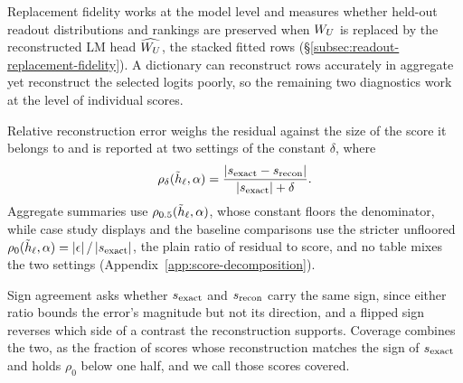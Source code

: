 Replacement fidelity works at the model level and measures whether
held-out readout distributions and rankings are preserved when
\(W_U\) is replaced by the reconstructed LM head \(\widehat{W_U}\),
the stacked fitted rows (\S\ref{subsec:readout-replacement-fidelity}). A dictionary
can reconstruct rows accurately in aggregate yet reconstruct the
selected logits poorly, so the remaining two diagnostics work at the
level of individual scores.

Relative reconstruction error weighs the
residual against the size of the score it belongs to and is reported
at two settings of the constant \(\delta\), where
\[
    \rho_\delta(\tilde h_\ell,\alpha)
    =\frac{|s_{\mathrm{exact}}-s_{\mathrm{recon}}|}
    {|s_{\mathrm{exact}}|+\delta}.
\]
Aggregate summaries use \(\rho_{0.5}(\tilde h_\ell,\alpha)\), whose
constant floors the denominator, while case study displays and the
baseline comparisons use the stricter unfloored
\(\rho_0(\tilde h_\ell,\alpha)=|\epsilon|\,/\,|s_{\mathrm{exact}}|\), the plain ratio
of residual to score, and no table mixes the two settings
(Appendix~\ref{app:score-decomposition}).

Sign agreement asks whether \(s_{\mathrm{exact}}\) and \(s_{\mathrm{recon}}\) carry the same sign, since
either ratio bounds the error's magnitude but not its direction, and a
flipped sign reverses which side of a contrast the reconstruction
supports.
Coverage combines the two, as the fraction of scores whose
reconstruction matches the sign of \(s_{\mathrm{exact}}\) and holds \(\rho_0\)
below one half, and we call those scores covered.
